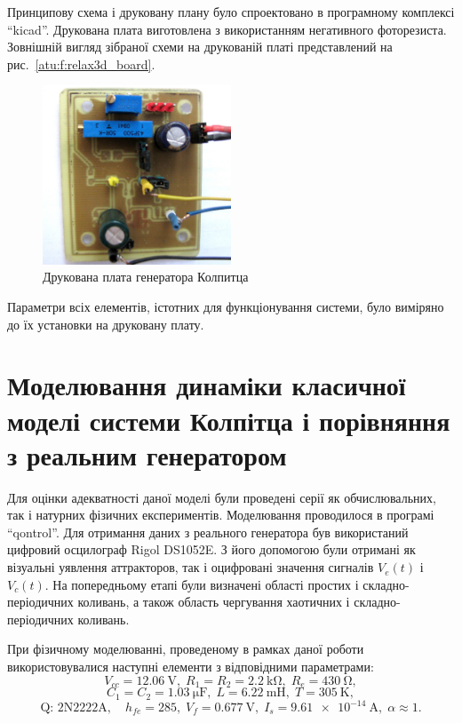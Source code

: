 Принципову схема і друковану плану було спроектовано в
програмному комплексі ``kicad''. Друкована плата виготовлена
з використанням негативного фоторезиста. Зовнішній
вигляд зібраної схеми на друкованій платі представлений
на рис.~\ref{atu:f:relax3d_board}.

\begin{figure}[htb!]
\centerline{\includegraphics[width=0.5\textwidth]{p/colp_board.jpg} }
\caption{Друкована плата генератора Колпитца}
\label{atu:f:colp_board}
\end{figure}

Параметри всіх елементів, істотних для функціонування системи,
було виміряно до їх установки на друковану плату.



\section{Моделювання динаміки класичної моделі системи Колпітца і порівняння з реальним генератором}%

Для оцінки адекватності даної моделі були проведені
серії як обчислювальних, так і натурних фізичних
експериментів.
Моделювання проводилося в програмі ``qontrol''.
Для отримання даних з реального генератора був використаний
цифровий осцилограф Rigol DS1052E. З його допомогою були отримані
як візуальні уявлення аттракторов, так і оцифровані значення
сигналів
$ V_e (t) $ і
$ V_c (t) $. На попередньому етапі були визначені області простих
і складно-періодичних коливань, а також область чергування
хаотичних і складно-періодичних коливань.

При фізичному моделюванні, проведеному в рамках даної
роботи використовувалися наступні елементи з відповідними
параметрами:
%
\[
  V_{cc} = \SI{12.06}{\volt},          \;
  R_1 = R_2 = \SI{2.2}{\kilo\ohm},     \;
  R_e = \SI{430}{\ohm},
\]
%
\[
  C_1 = C_2 = \SI{1.03}{\micro\farad}, \;
  L = \SI{6.22}{\milli\henry},         \;
  T = \SI{305}{\kelvin},
\]
%
\[
  \text{Q: 2N2222A}, \quad
  h_{fe}=285, \;
  V_f = \SI{0.677}{\volt}, \;
  I_s = \SI{9.61e-14}{\ampere}, \;
  \alpha \approx 1.
\]

